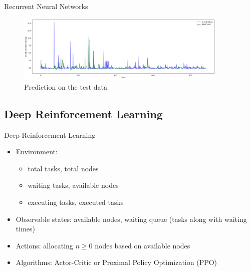\begin{frame}{Recurrent Neural Networks}
    \begin{figure}
        \includegraphics[width=0.9\textwidth]{img/test_accuracy.png}
        \caption{Prediction on the test data}
    \end{figure}
\end{frame}

\subsection{Deep Reinforcement Learning}

\begin{frame}{Deep Reinforcement Learning}
    \begin{itemize}
        \item Environment:
              \begin{itemize}
                  \item total tasks, total nodes
                  \item waiting tasks, available nodes
                  \item executing tasks, executed tasks
              \end{itemize}
        \item Observable states: available nodes, waiting queue (tasks along with waiting times)
        \item Actions: allocating $n \ge 0$ nodes based on available nodes
        \item Algorithms: Actor-Critic  or Proximal Policy Optimization (PPO) 
    \end{itemize}
\end{frame}

